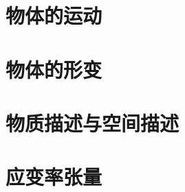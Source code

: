 \documentclass[zihao=-4,linespread=1.5,heading=true,a4paper,twoside]{ctexart}
\theoremstyle{definition}
\theoremstyle{plain}
\begin{document}
\section{物体的运动}


\section{物体的形变}


\section{物质描述与空间描述}


\section{应变率张量}









\end{document}
